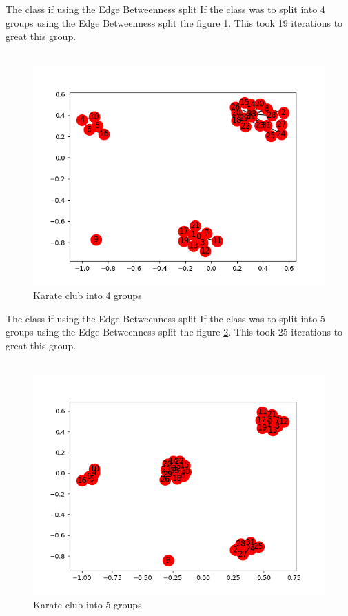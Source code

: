 \documentclass[10pt,letterpaper]{article}
\begin{document}
The class if using the Edge Betweenness split
If the class was to split into 4 groups using the Edge Betweenness split the figure \ref{fig:kart5}.  This took 19 iterations to great this group.\\
\\
\begin{figure}[h!]
  \includegraphics[width=\linewidth]{karate19.png}
  \caption{ Karate club into 4 groups}
  \label{fig:kart5}
 \end{figure}
  
The class if using the Edge Betweenness split
If the class was to split into 5 groups using the Edge Betweenness split the figure \ref{fig:kart6}.  This took 25 iterations to great this group.\\
\\
\begin{figure}[h!]
  \includegraphics[width=\linewidth]{karate25.png}
  \caption{ Karate club into 5 groups}
  \label{fig:kart6}  
\end{figure}
\pagebreak
\end{document}
